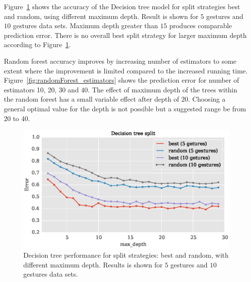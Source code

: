 \documentclass{article}
\begin{document}

Figure~\ref{fig:DT_dept_split} shows the accuracy of the Decision tree model for split strategies best and random, using different maximum depth. Result is shown for $5$ gestures and $10$ gestures data sets. Maximum depth greater than $15$ produces comparable prediction error. There is no overall best split strategy for larger maximum depth according to Figure~\ref{fig:DT_dept_split}.

Random forest accuracy improves by increasing number of estimators to some extent where the improvement is limited compared to the increased running time. Figure~\ref{fig:randomForest_estimators} shows the prediction error for number of estimators 10, 20, 30 and 40. The effect of maximum depth of the trees within the random forest has a small variable effect after depth of $20$. Choosing a general optimal value for the depth is not possible but a suggested range be from $20$ to $40$.



\begin{figure}[t]
\vskip 0.2in
\begin{center}
\centerline{\includegraphics[width=\columnwidth]{DT_max_depth_split.eps}}
\caption{Decision tree performance for split strategies: best and random, with different maximum depth. Results is shown for $5$ gestures and $10$ gestures data sets.}
\label{fig:DT_dept_split}
\end{center}
\vskip -0.2in
\end{figure}
\end{document}

